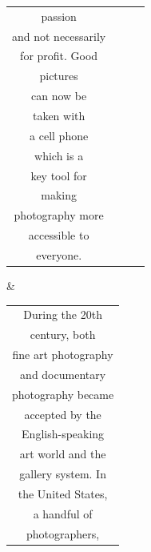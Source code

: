 \documentclass{article}
\begin{document}
\begin{table}[]
\begin{tabular}{|c|c|c|c|}
passion \\ and not necessarily \\ for profit. Good\\  pictures \\ can now be \\ taken with \\ a cell phone \\ which is a\\  key tool for\\  making \\ photography more \\ accessible to \\ everyone.\end{tabular} & \begin{tabular}[c]{@{}c@{}}During the 20th \\ century, both \\ fine art photography \\ and documentary \\ photography became \\ accepted by the \\ English-speaking \\ art world and the \\ gallery system. In \\ the United States,\\ a handful of \\ photographers, \\ 
\end{tabular}
\end{table}
\end{document}
